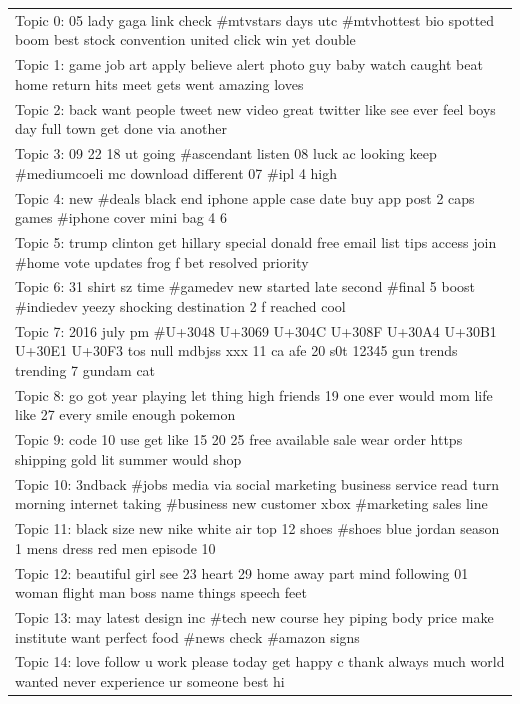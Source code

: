 \documentclass[11pt]{article}
\begin{document}
\begin{appendices}
\begin{table}
    \centering
    \begin{tabular}{|p{\linewidth}|}
    \hline
    Topic 0: 05 lady gaga link check \#mtvstars days utc \#mtvhottest bio spotted boom best stock convention united click win yet double\\
    Topic 1: game job art apply believe alert photo guy baby watch caught beat home return hits meet gets went amazing loves\\
    Topic 2: back want people tweet new video great twitter like see ever feel boys day full town get done via another\\
    Topic 3: 09 22 18 ut going \#ascendant listen 08 luck ac looking keep \#mediumcoeli mc download different 07 \#ipl 4 high\\
    Topic 4: new \#deals black end iphone apple case date buy app post 2 caps games \#iphone cover mini bag 4 6\\
    Topic 5: trump clinton get hillary special donald free email list tips access join \#home vote updates frog f bet resolved priority\\
    Topic 6: 31 shirt sz time \#gamedev new started late second \#final 5 boost \#indiedev yeezy shocking destination 2 f reached cool\\
    Topic 7: 2016 july pm \#U+3048 U+3069 U+304C U+308F U+30A4 U+30B1 U+30E1 U+30F3 tos null mdbjss xxx 11 ca afe 20 s0t 12345 gun trends trending 7 gundam cat\\
    Topic 8: go got year playing let thing high friends 19 one ever would mom life like 27 every smile enough pokemon\\
    Topic 9: code 10 use get like 15 20 25 free available sale wear order https shipping gold lit summer would shop\\
    Topic 10: 3ndback \#jobs media via social marketing business service read turn morning internet taking \#business new customer xbox \#marketing sales line\\
    Topic 11: black size new nike white air top 12 shoes \#shoes blue jordan season 1 mens dress red men episode 10\\
    Topic 12: beautiful girl see 23 heart 29 home away part mind following 01 woman flight man boss name things speech feet\\
    Topic 13: may latest design inc \#tech new course hey piping body price make institute want perfect food \#news check \#amazon signs\\
    Topic 14: love follow u work please today get happy c thank always much world wanted never experience ur someone best hi\\

\end{tabular}
\end{table}
\end{appendices}
\end{document}
